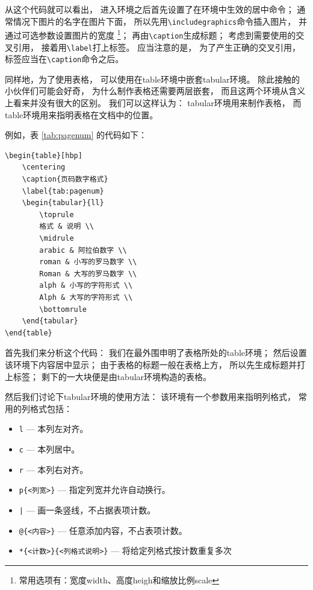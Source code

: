 \documentclass{ctexart}
\numberwithin{equation}{section}			%
\begin{document}
	从这个代码就可以看出，
	进入环境之后首先设置了在环境中生效的居中命令；
	通常情况下图片的名字在图片下面，
	所以先用\verb|\includegraphics|命令插入图片，
	并通过可选参数设置图片的宽度
	\footnote{常用选项有：宽度width、高度heigh和缩放比例scale}；
	再由\verb|\caption|生成标题；
	考虑到需要使用的交叉引用，
	接着用\verb|\label|打上标签。
	应当注意的是，
	为了产生正确的交叉引用，
	标签应当在\verb|\caption|命令之后。
	
	同样地，为了使用表格，
	可以使用在table环境中嵌套tabular环境。
	除此接触的小伙伴们可能会好奇，
	为什么制作表格还需要两层嵌套，
	而且这两个环境从含义上看来并没有很大的区别。
	我们可以这样认为：
	tabular环境用来制作表格，
	而table环境用来指明表格在文档中的位置。

	例如，表 \ref{tab:pagenum} 的代码如下：
	
\begin{lstlisting}
\begin{table}[hbp]
	\centering
	\caption{页码数字格式}
	\label{tab:pagenum}
	\begin{tabular}{ll}
		\toprule
		格式 & 说明 \\
		\midrule
		arabic & 阿拉伯数字 \\
		roman & 小写的罗马数字 \\
		Roman & 大写的罗马数字 \\
		alph & 小写的字符形式 \\
		Alph & 大写的字符形式 \\
		\bottomrule
	\end{tabular}
\end{table}
\end{lstlisting}

	首先我们来分析这个代码：
	我们在最外围申明了表格所处的table环境；
	然后设置该环境下内容居中显示；
	由于表格的标题一般在表格上方，
	所以先生成标题并打上标签；
	剩下的一大块便是由tabular环境构造的表格。
	
	然后我们讨论下tabular环境的使用方法：
	该环境有一个参数用来指明列格式，
	常用的列格式包括：
	
	\begin{itemize}
		\item \verb|l| --- 本列左对齐。
		\item \verb|c| --- 本列居中。
		\item \verb|r| --- 本列右对齐。
		\item \verb|p{<列宽>}| --- 指定列宽并允许自动换行。
		\item \verb=|= --- 画一条竖线，不占据表项计数。
		\item \verb|@{<内容>}| --- 任意添加内容，不占表项计数。
		\item \verb|*{<计数>}{<列格式说明>}| --- 将给定列格式按计数重复多次
	\end{itemize}
\end{document}
